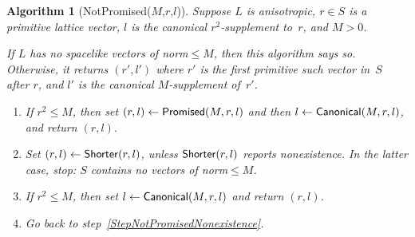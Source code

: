 \documentclass[12pt]{amsart}
\numberwithin{theorem}{section}
\numberwithin{equation}{section}
\numberwithin{figure}{section}
\newtheorem{algorithm}[theorem]{Algorithm}
\theoremstyle{remark}
\begin{document}
\begin{algorithm}[{\sf NotPromised($M$,$r$,$l$)}]
    \label{AlgorithmNotPromised}
    Suppose $L$ is anisotropic, $r\in S$ is a primitive lattice vector, 
    $l$ is the canonical $r^2$-supplement to~$r$, and 
    $M>0$.  

    If $L$ has no spacelike vectors of norm${}\leq M$, then this algorithm says so.
    Otherwise, it returns $(r',l')$ where $r'$ is the first primitive such
    vector in~$S$ after $r$, and $l'$ is the canonical $M$-supplement of~$r'$.

    \begin{enumerate}
        \item{}
            \label{StepNotPromisedEasyCase}
            If $r^2\leq M$, then set $(r,l)\leftarrow{\sf Promised}(M,r,l)$
            and then $l\leftarrow{\sf Canonical}(M,r,l)$, and return
            $(r,l)$.
        \item\relax{\sf[Nonexistence?]}
            \label{StepNotPromisedNonexistence}
            Set $(r,l)\leftarrow{\sf Shorter}(r,l)$, unless ${\sf Shorter}(r,l)$
            reports nonexistence.  In the latter case, stop: $S$ contains
            no vectors of norm${}\leq M$.
        \item\relax{\sf[Done?]}
            \label{StepNotPromisedDone}
            If $r^2\leq M$, then set $l\leftarrow{\sf Canonical}(M,r,l)$
            and return $(r,l)$.
        \item\relax{\sf[Repeat]}
            \label{StepNotPromisedRepeat}
            Go back to step~\ref{StepNotPromisedNonexistence}.
    \end{enumerate}
\end{algorithm}
\end{document}
